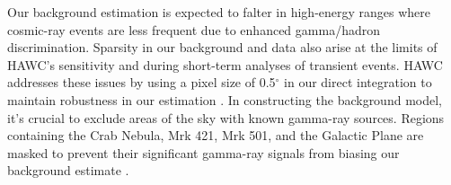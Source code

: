 Our background estimation is expected to falter in high-energy ranges where cosmic-ray events are less frequent due to enhanced gamma/hadron discrimination. Sparsity in our background and data also arise at the limits of HAWC's sensitivity and during short-term analyses of transient events.
HAWC addresses these issues by using a pixel size of 0.5$^\circ$ in our direct integration to maintain robustness in our estimation \cite{Abeysekara_2017,wcd_Sensitivity}.
In constructing the background model, it's crucial to exclude areas of the sky with known gamma-ray sources.
Regions containing the Crab Nebula, Mrk 421, Mrk 501, and the Galactic Plane are masked to prevent their significant gamma-ray signals from biasing our background estimate \cite{Abeysekara_2017}.
